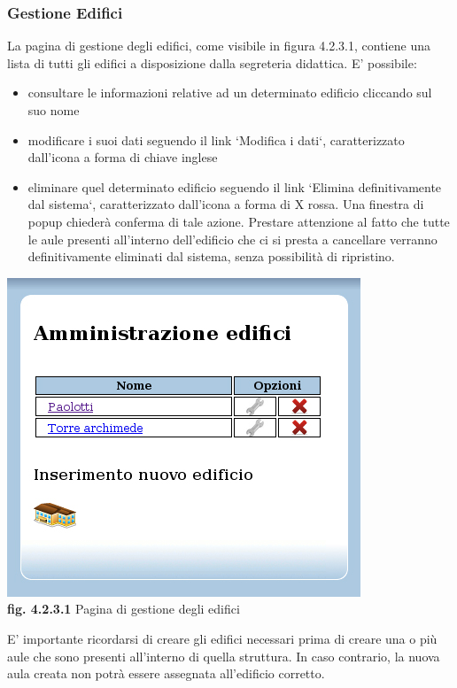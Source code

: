 \documentclass[11pt,a4paper]{article}
\begin{document}
\subsubsection{Gestione Edifici}
La pagina di gestione degli edifici, come visibile in figura 4.2.3.1, contiene una lista di tutti gli edifici a disposizione dalla segreteria didattica.
E' possibile:
\begin{itemize}
 \item consultare le informazioni relative ad un determinato edificio cliccando sul suo nome
 \item modificare i suoi dati seguendo il link `Modifica i dati`, caratterizzato dall'icona a forma di chiave inglese
 \item eliminare quel determinato edificio seguendo il link `Elimina definitivamente dal sistema`, caratterizzato dall'icona a forma di X rossa. Una finestra di popup chiederà conferma di tale azione. Prestare attenzione al fatto che tutte le aule presenti all'interno dell'edificio che ci si presta a cancellare verranno definitivamente eliminati dal sistema, senza possibilità di ripristino.
\end{itemize}

\bigskip
\begin{center}
	\includegraphics[scale=0.5]{images/amministrazione_edifici.jpg}\\
	\textbf{fig. 4.2.3.1} Pagina di gestione degli edifici\\
\end{center}
\bigskip

E' importante ricordarsi di creare gli edifici necessari prima di creare una o più aule che sono presenti all'interno di quella struttura. In caso contrario, la nuova aula creata non potrà essere assegnata all'edificio corretto.
\end{document}
